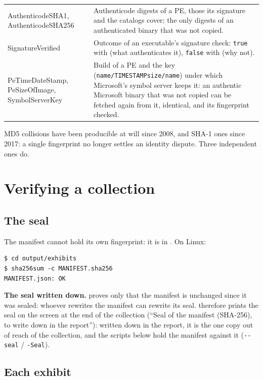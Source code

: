 \documentclass[11pt,a4paper,oneside]{report}
\begin{document}
\begin{longtable}{@{}>{\ttfamily}L{4.2cm}L{10.2cm}@{}}
AuthenticodeSHA1, AuthenticodeSHA256 & Authenticode digests of a PE, those its
  signature and the catalogs cover; the only digests of an authenticated binary
  that was not copied. \\
SignatureVerified & Outcome of an executable's signature check: \texttt{true}
  with  (what authenticates it), \texttt{false} with
   (why not). \\
PeTimeDateStamp, PeSizeOfImage, SymbolServerKey & Build of a PE and the key
  (\texttt{name/TIMESTAMPsize/name}) under which Microsoft's symbol server keeps
  it: an authentic Microsoft binary that was not copied can be fetched again
  from it, identical, and its fingerprint checked. \\
\bottomrule
\end{longtable}

\begin{note}
MD5 collisions have been producible at will since 2008, and SHA-1 ones since
2017: a single fingerprint no longer settles an identity dispute. Three
independent ones do.
\end{note}

\section{Verifying a collection}\label{sec:verif}

\subsection{The seal}

The manifest cannot hold its own fingerprint: it is in
. On Linux:

\begin{lstlisting}
$ cd output/exhibits
$ sha256sum -c MANIFEST.sha256
MANIFEST.json: OK
\end{lstlisting}

\textbf{The seal written down.}  proves only that
the manifest is unchanged since it was sealed: whoever rewrites the manifest
can rewrite its seal. \wac{} therefore prints the seal on the screen at the
end of the collection (``Seal of the manifest (SHA-256), to write down in
the report''): written down in the report, it is the one copy out of
reach of the collection, and the scripts below hold the manifest against it
(\texttt{-{}-seal} / \texttt{-Seal}).

\subsection{Each exhibit}
\end{document}
